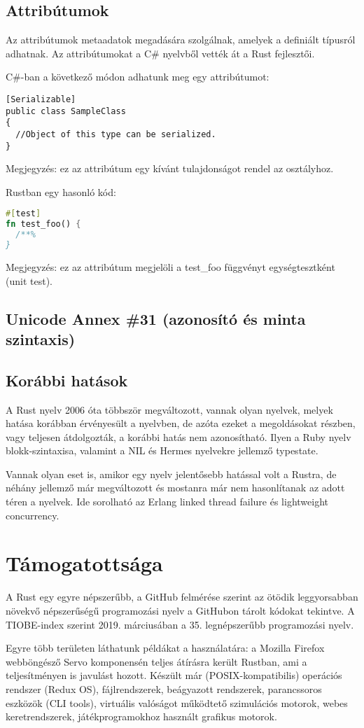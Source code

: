\subsection{Attribútumok}
Az attribútumok metaadatok megadására szolgálnak, amelyek a definiált típusról adhatnak. Az attribútumokat a C\# nyelvből vették át a Rust fejlesztői.

C\#-ban a következő módon adhatunk meg egy attribútumot:
\begin{lstlisting}
[Serializable]
public class SampleClass
{
  //Object of this type can be serialized.
}
\end{lstlisting}
Megjegyzés: ez az attribútum egy kívánt tulajdonságot rendel az osztályhoz.

Rustban egy hasonló kód:
\begin{lstlisting}[language=Rust, style=boxed]
#[test]
fn test_foo() {
  /**%
}
\end{lstlisting}
Megjegyzés: ez az attribútum megjelöli a test\_foo függvényt egységtesztként (unit test).

\subsection{Unicode Annex \#31 (azonosító és minta szintaxis)}

\subsection{Korábbi hatások}
A Rust nyelv 2006 óta többször megváltozott, vannak olyan nyelvek, melyek hatása korábban érvényesült a nyelvben, de azóta ezeket a megoldásokat részben, vagy teljesen átdolgozták, a korábbi hatás nem azonosítható. Ilyen a Ruby nyelv blokk-szintaxisa, valamint a NIL és Hermes nyelvekre jellemző typestate.

Vannak olyan eset is, amikor egy nyelv jelentősebb hatással volt a Rustra, de néhány jellemző már megváltozott és mostanra már nem hasonlítanak az adott téren a nyelvek. Ide sorolható az Erlang linked thread failure és lightweight concurrency.

\section{Támogatottsága}
A Rust egy egyre népszerűbb, a GitHub felmérése szerint az ötödik leggyorsabban növekvő népszerűségű programozási nyelv a GitHubon tárolt kódokat tekintve. A TIOBE-index szerint 2019. márciusában a 35. legnépszerűbb programozási nyelv.

Egyre több területen láthatunk példákat a használatára: a Mozilla Firefox webböngésző Servo komponensén teljes átírásra került Rustban, ami a teljesítményen is javulást hozott. Készült már (POSIX-kompatibilis) operációs rendszer (Redux OS), fájlrendszerek, beágyazott rendszerek, parancssoros eszközök (CLI tools), virtuális valóságot működtető szimulációs motorok, webes keretrendszerek, játékprogramokhoz használt grafikus motorok.
